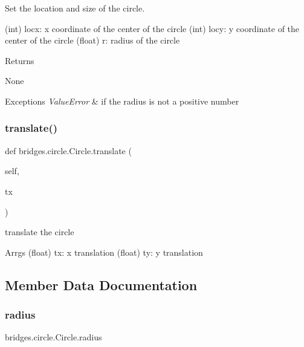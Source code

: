 Set the location and size of the circle. 

(int) locx\+: x coordinate of the center of the circle (int) locy\+: y coordinate of the center of the circle (float) r\+: radius of the circle \begin{DoxyReturn}{Returns}


None
\end{DoxyReturn}

\begin{DoxyExceptions}{Exceptions}
{\em Value\+Error} & if the radius is not a positive number \\
\hline
\end{DoxyExceptions}
\mbox{\label{classbridges_1_1circle_1_1_circle_a45281756c505403dcee3bd5d0d04681f}} 
\subsubsection{\texorpdfstring{translate()}{translate()}}
{\footnotesize\ttfamily def bridges.\+circle.\+Circle.\+translate (\begin{DoxyParamCaption}\item[{}]{self,  }\item[{}]{tx }\end{DoxyParamCaption})}



translate the circle 

\begin{DoxyParagraph}{Arrgs}
(float) tx\+: x translation (float) ty\+: y translation 
\end{DoxyParagraph}


\subsection{Member Data Documentation}
\mbox{\label{classbridges_1_1circle_1_1_circle_ab52ae32c28ea4175b815a7b04491205b}} 
\subsubsection{\texorpdfstring{radius}{radius}}
{\footnotesize\ttfamily bridges.\+circle.\+Circle.\+radius}

